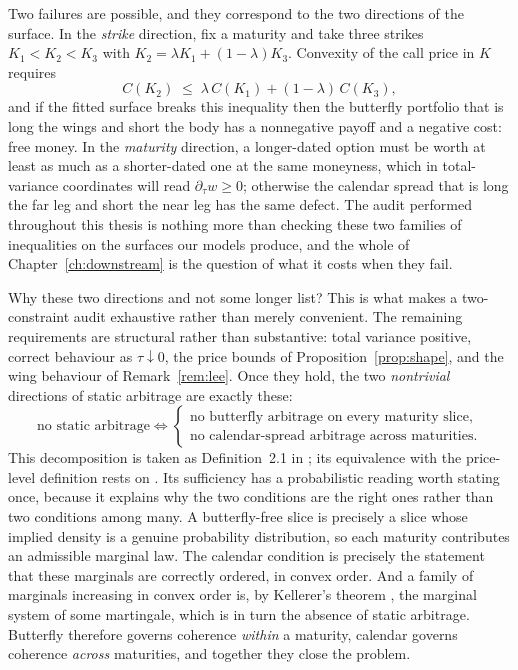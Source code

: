 Two failures are possible, and they correspond to the two directions of the surface. In the
\emph{strike} direction, fix a maturity and take three strikes $K_1<K_2<K_3$ with
$K_2=\lambda K_1+(1-\lambda)K_3$. Convexity of the call price in $K$ requires
\[
C(K_2)\;\le\;\lambda\,C(K_1)+(1-\lambda)\,C(K_3),
\]
and if the fitted surface breaks this inequality then the butterfly portfolio that is long the
wings and short the body has a nonnegative payoff and a negative cost: free money. In the
\emph{maturity} direction, a longer-dated option must be worth at least as much as a
shorter-dated one at the same moneyness, which in total-variance coordinates will read
$\partial_\tau w\ge0$; otherwise the calendar spread that is long the far leg and short the near
leg has the same defect. The audit performed throughout this thesis is nothing more than
checking these two families of inequalities on the surfaces our models produce, and the whole of
Chapter~\ref{ch:downstream} is the question of what it costs when they fail.

Why these two directions and not some longer list? This is what makes a two-constraint audit
exhaustive rather than merely convenient. The remaining requirements are structural rather than
substantive: total variance positive, correct behaviour as $\tau\downarrow0$, the price bounds of
Proposition~\ref{prop:shape}, and the wing behaviour of Remark~\ref{rem:lee}. Once they hold, the
two \emph{nontrivial} directions of static arbitrage are exactly these:
\[
\text{no static arbitrage}
\iff
\begin{cases}
\text{no butterfly arbitrage on every maturity slice,}\\[2pt]
\text{no calendar-spread arbitrage across maturities.}
\end{cases}
\]
This decomposition is taken as Definition~2.1 in \cite{gatheraljacquier2014}; its equivalence
with the price-level definition rests on \cite{coxhobson2005,kellerer1972}. Its sufficiency has a probabilistic reading worth stating
once, because it explains why the two conditions are the right ones rather than two conditions
among many. A butterfly-free slice is precisely a slice whose implied density is a genuine
probability distribution, so each maturity contributes an admissible marginal law. The calendar
condition is precisely the statement that these marginals are correctly ordered, in convex
order. And a family of marginals increasing in convex order is, by Kellerer's theorem
\cite{kellerer1972}, the marginal system of some martingale, which is in turn the absence of
static arbitrage. Butterfly therefore governs coherence \emph{within} a maturity, calendar
governs coherence \emph{across} maturities, and together they close the problem.

